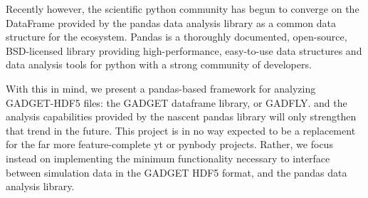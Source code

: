 Recently however, the scientific python community has begun to converge on the DataFrame provided by the pandas data analysis library as a common data structure for the ecosystem. 
Pandas is a thoroughly documented, open-source, BSD-licensed library providing high-performance, easy-to-use data structures and data analysis tools for python with a strong community of developers. 

With this in mind, we present a pandas-based framework for analyzing GADGET-HDF5 files: the GADGET dataframe library, or GADFLY.
and the analysis capabilities provided by the nascent pandas library will only strengthen that trend in the future.  
This project is in no way expected to be a replacement for the far more feature-complete yt or pynbody projects. Rather, we focus instead on implementing the minimum functionality necessary to interface between simulation data in the GADGET HDF5 format, and the pandas data analysis library.%
